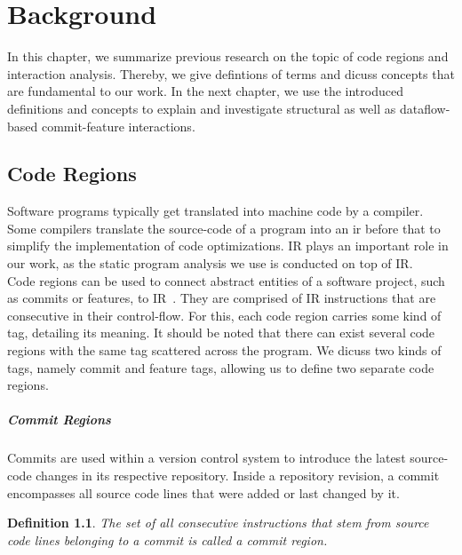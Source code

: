 \chapter{Background}\label{ch:background}

In this chapter, we summarize previous research on the topic of code regions and interaction analysis.
Thereby, we give defintions of terms and dicuss concepts that are fundamental to our work.
In the next chapter, we use the introduced definitions and concepts to explain and investigate structural as well as dataflow-based commit-feature interactions.

\section{Code Regions}\label{ch:code_regions}
Software programs typically get translated into machine code by a compiler.
Some compilers translate the source-code of a program into an \ac{ir} before that to simplify the implementation of code optimizations.
IR plays an important role in our work, as the static program analysis we use is conducted on top of IR. \\
Code regions can be used to connect abstract entities of a software project, such as commits or features, to IR~\cite{sattler2023seal}.
They are comprised of IR instructions that are consecutive in their control-flow.
For this, each code region carries some kind of tag, detailing its meaning.
It should be noted that there can exist several code regions with the same tag scattered across the program.
We dicuss two kinds of tags, namely commit and feature tags, allowing us to define two separate code regions. 

\paragraph{Commit Regions}\label{sec:commit_regions}

Commits are used within a version control system to introduce the latest source-code changes in its respective repository.
Inside a repository revision, a commit encompasses all source code lines that were added or last changed by it. 

\newtheorem{definition}{Definition}
\newcommand{\definitionautorefname}{Definition}
\begin{definition}\label{def:commit_regions}
	\emph{The set of all consecutive instructions that stem from source code lines belonging to a commit is called a} commit region.
\end{definition}

